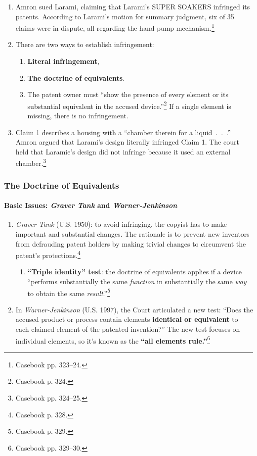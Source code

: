\begin{enumerate}
    \item Amron sued Larami, claiming that Larami's SUPER SOAKERS infringed its 
    patents. According to Larami's motion for summary judgment, six of 35 claims 
    were in dispute, all regarding the hand pump mechanism.\footnote{Casebook 
    pp. 323--24.}
    \item There are two ways to establish infringement:
    \begin{enumerate}
        \item \textbf{Literal infringement},
        \item \textbf{The doctrine of equivalents}.
        \item The patent owner must ``show the presence of every element or its 
        substantial equivalent in the accused device.''\footnote{Casebook p. 
        324.} If a single element is missing, there is no infringement.
    \end{enumerate}
    \item Claim 1 describes a housing with a ``chamber therein for a 
    liquid~.~.~.'' Amron argued that Larami's design literally infringed Claim 
    1. The court held that Laramie's design did not infringe because it used an 
    external chamber.\footnote{Casebook pp. 324--25.}
\end{enumerate}

\subsubsection{The Doctrine of Equivalents}

\paragraph{Basic Issues: \emph{Graver Tank} and \emph{Warner-Jenkinson}}

\begin{enumerate}
    \item \emph{Graver Tank} (U.S. 1950): to avoid infringing, the copyist has 
    to make important and substantial changes. The rationale is to prevent new 
    inventors from defrauding patent holders by making trivial changes to 
    circumvent the patent's protections.\footnote{Casebook p. 328.}
    \begin{enumerate}
        \item \textbf{``Triple identity'' test}: the doctrine of equivalents 
        applies if a device ``performs substantially the same \emph{function} 
        in substantially the same \emph{way} to obtain the same 
        \emph{result}.''\footnote{Casebook p. 329.}
    \end{enumerate}
    \item In \emph{Warner-Jenkinson} (U.S. 1997), the Court articulated a new 
    test: ``Does the accused product or process contain elements 
    \textbf{identical or equivalent} to each claimed element of the patented 
    invention?'' The new test focuses on individual elements, so it's known as 
    the \textbf{``all elements rule.''}\footnote{Casebook pp. 329--30.}
\end{enumerate}

